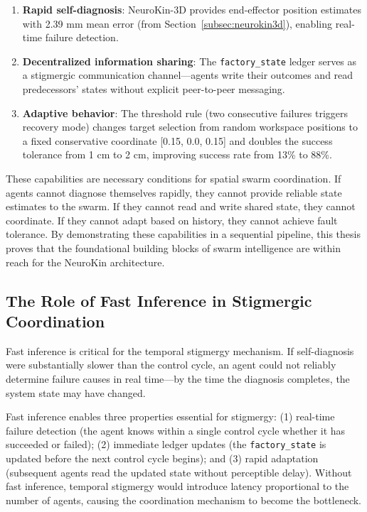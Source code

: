 \documentclass[12pt,a4paper,oneside]{report}
\begin{document}
\begin{enumerate}
    \item \textbf{Rapid self-diagnosis}: NeuroKin-3D provides end-effector position estimates with 2.39 mm mean error (from Section~\ref{subsec:neurokin3d}), enabling real-time failure detection.
    \item \textbf{Decentralized information sharing}: The \texttt{factory\_state} ledger serves as a stigmergic communication channel—agents write their outcomes and read predecessors' states without explicit peer-to-peer messaging.
    \item \textbf{Adaptive behavior}: The threshold rule (two consecutive failures triggers recovery mode) changes target selection from random workspace positions to a fixed conservative coordinate [0.15, 0.0, 0.15] and doubles the success tolerance from 1 cm to 2 cm, improving success rate from 13\% to 88\%.
\end{enumerate}

These capabilities are necessary conditions for spatial swarm coordination. If agents cannot diagnose themselves rapidly, they cannot provide reliable state estimates to the swarm. If they cannot read and write shared state, they cannot coordinate. If they cannot adapt based on history, they cannot achieve fault tolerance. By demonstrating these capabilities in a sequential pipeline, this thesis proves that the foundational building blocks of swarm intelligence are within reach for the NeuroKin architecture.

\subsection{The Role of Fast Inference in Stigmergic Coordination}
\label{subsec:the_role_of_fast_inference_in_stigmergic_coordination}

Fast inference is critical for the temporal stigmergy mechanism. If self-diagnosis were substantially slower than the control cycle, an agent could not reliably determine failure causes in real time—by the time the diagnosis completes, the system state may have changed.

Fast inference enables three properties essential for stigmergy: (1) real-time failure detection (the agent knows within a single control cycle whether it has succeeded or failed); (2) immediate ledger updates (the \texttt{factory\_state} is updated before the next control cycle begins); and (3) rapid adaptation (subsequent agents read the updated state without perceptible delay). Without fast inference, temporal stigmergy would introduce latency proportional to the number of agents, causing the coordination mechanism to become the bottleneck.
\end{document}
